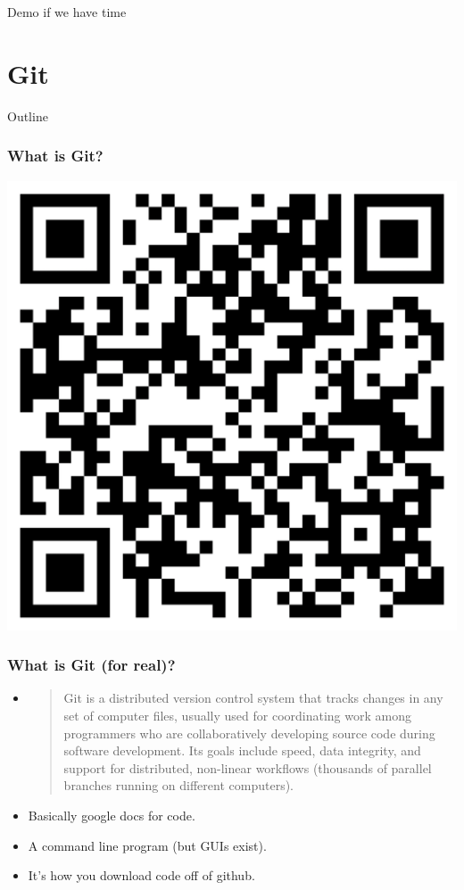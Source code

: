 \documentclass[aspectratio=169,hyperref={unicode}]{beamer}
\begin{document}
\begin{frame}

  \centering
  Demo if we have time
\end{frame}

\section{Git}

\begin{frame}{Outline}
\tableofcontents[currentsection]
\end{frame}

\begin{frame}
\frametitle{What is Git?}

\includegraphics[scale=0.5]{image.png}

\end{frame}

\begin{frame}
\frametitle{What is Git (for real)?}
\begin{itemize}
\item

\begin{quote}
Git  is a distributed version control system that tracks changes in any set of computer files, usually used for coordinating work among programmers who are collaboratively developing source code during software development. Its goals include speed, data integrity, and support for distributed, non-linear workflows (thousands of parallel branches running on different computers).
\end{quote}
\item Basically google docs for code.
\item A command line program (but GUIs exist).
\item It's how you download code off of github.
\end{itemize}
\end{frame}
\end{document}
